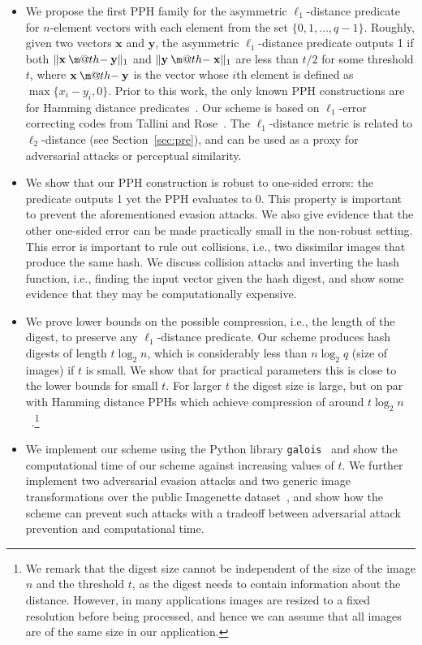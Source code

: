 \documentclass[pdflatex,sn-mathphys-num]{sn-jnl}
\makeatletter
\newcommand{\dotdiv}{\mathbin{\text{\@dotdiv}}}
\newcommand{\@dotdiv}{%
  \ooalign{\hidewidth\raise1ex\hbox{.}\hidewidth\cr$\m@th-$\cr}%
}
\theoremstyle{definition}
\newcommand{\vtr}[1]{\mathbf{#1}}
\newcommand{\norm}[1]{\lVert{#1}\rVert}
\makeatother
\begin{document}
\begin{itemize}
    \item We propose the first PPH family for the asymmetric $\ell_1$-distance predicate for $n$-element vectors with each element from the set $\{0, 1, \ldots, q-1\}$. Roughly, given two vectors $\vtr{x}$ and $\vtr{y}$, the asymmetric $\ell_1$-distance predicate outputs 1 if both $\norm{\vtr{x} \dotdiv \vtr{y}}_1$ and $\norm{\vtr{y} \dotdiv \vtr{x}}_1$ are less than $t/2$ for some threshold $t$, where $\vtr{x} \dotdiv \vtr{y}$ is the vector whose $i$th element is defined as $\max\{x_i - y_i, 0\}$. Prior to this work, the only known PPH constructions are for Hamming distance predicates~\cite{boyle2018adversarially, holmgren2022nearly, fleischhacker2021robust, fleischhacker2022property}. Our scheme is based on $\ell_1$-error correcting codes from Tallini and Rose~\cite{tallinil1codes}. The $\ell_1$-distance metric is related to $\ell_2$-distance (see Section~\ref{sec:pre}), and can be used as a proxy for adversarial attacks or perceptual similarity. 
    \item We show that our PPH construction is robust to one-sided errors: the predicate outputs 1 yet the PPH evaluates to 0. This property is important to prevent the aforementioned evasion attacks. We also give evidence that the other one-sided error can be made practically small in the non-robust setting. This error is important to rule out collisions, i.e., two dissimilar images that produce the same hash. We discuss collision attacks and inverting the hash function, i.e., finding the input vector given the hash digest, and show some evidence that they may be computationally expensive.  
    \item We prove lower bounds on the possible compression, i.e., the length of the digest, to preserve any $\ell_1$-distance predicate. Our scheme produces hash digests of length $t \log_2 n$, which is considerably less than $n \log_2 q$ (size of images) if $t$ is small. We show that for practical parameters this is close to the lower bounds for small $t$. For larger $t$ the digest size is large, but on par with Hamming distance PPHs which achieve compression of around $t \log_2 n$~\cite{holmgren2022nearly}.\footnote{We remark that the digest size cannot be  independent of the size of the image $n$ and the threshold $t$, as the digest needs to contain information about the distance. However, in many applications images are resized to a fixed resolution before being processed, and hence we can assume that all images are of the same size in our application.}
    \item We implement our scheme using the Python library \verb+galois+~\cite{Hostetter_Galois_2020} and show the computational time of our scheme against increasing values of $t$. We further implement two adversarial evasion attacks and two generic image transformations over the public Imagenette dataset~\cite{imagenette}, and show how the scheme can prevent such attacks with a tradeoff between adversarial attack prevention and computational time.
\end{itemize}
\end{document}
